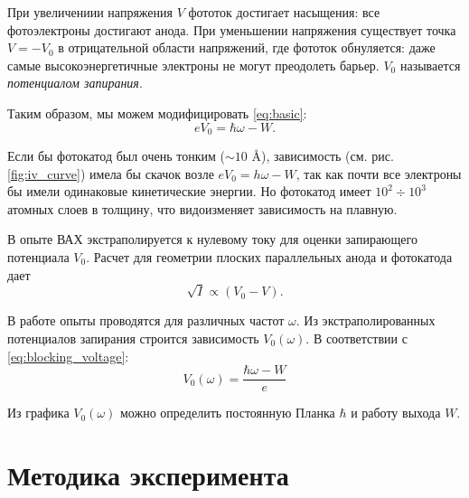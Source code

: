 \documentclass[12pt,a4paper]{article}
\newcommand{\figref}[1]{(см. рис. \ref{#1})}
\begin{document}
	При увеличениии напряжения $V$ фототок достигает насыщения: все фотоэлектроны достигают анода. При уменьшении напряжения существует точка $V = -V_0$  в отрицательной области напряжений, где фототок обнуляется: даже самые высокоэнергетичные электроны не могут преодолеть барьер. $V_0$ называется \textit{потенциалом запирания}.
	
	Таким образом, мы можем модифицировать \eqref{eq:basic}:
	\begin{equation}
		e V_0 = \hbar \omega - W.
		\label{eq:blocking_voltage}
	\end{equation}
	
	Если бы фотокатод был очень тонким ($\sim 10$ \AA), зависимость \figref{fig:iv_curve} имела бы скачок возле $eV_0 = h\omega - W$, так как почти все электроны бы имели одинаковые кинетические энергии. Но фотокатод имеет $10^2 \div 10^3$ атомных слоев в толщину, что видоизменяет зависимость на плавную.
	
	В опыте ВАХ экстраполируется к нулевому току для оценки запирающего потенциала $V_0$. Расчет для геометрии плоских параллельных анода и фотокатода дает 
	\begin{equation}
		\sqrt{I} \propto (V_0 - V).
		\label{eq:iv}
	\end{equation}
	
	В работе опыты проводятся для различных частот $\omega$. Из экстраполированных потенциалов запирания строится зависимость $V_0(\omega)$. В соответствии с \eqref{eq:blocking_voltage}:
	\begin{equation}
		V_0(\omega) = \frac{\hbar\omega - W}{e}
		\label{eq:v0_omega}
	\end{equation}
	
	Из графика $V_0(\omega)$ можно определить постоянную Планка $\hbar$ и работу выхода $W$.
	
	\section*{Методика эксперимента}
	
\end{document}
